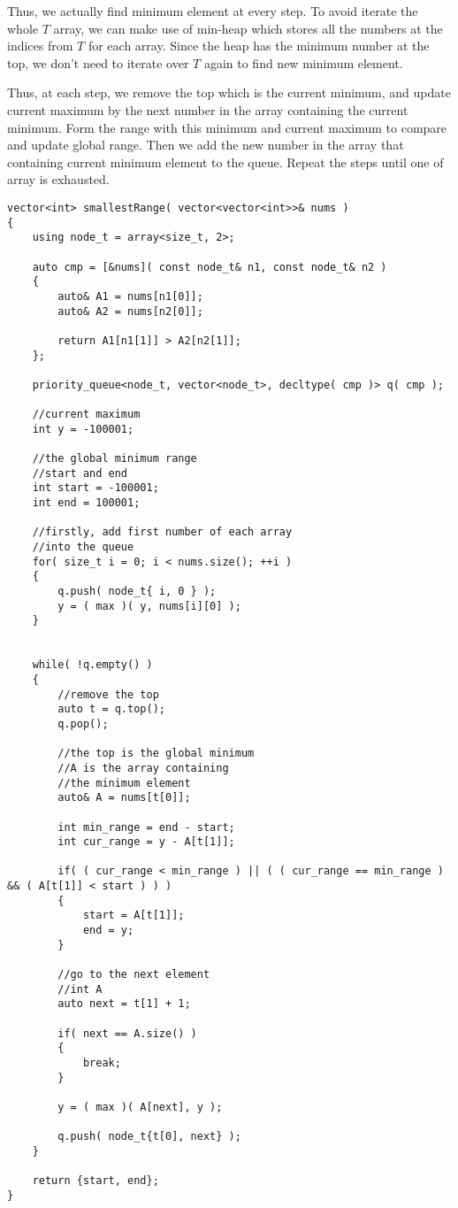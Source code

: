 Thus, we actually find minimum element at every step. To avoid iterate the whole $T$ array, we can make use of min-heap which stores all the numbers at the indices from $T$ for each array. Since the heap has the minimum number at the top, we don't need to iterate over $T$ again to find new minimum element.

Thus, at each step, we remove the top which is the current minimum, and update current maximum by the next number in the array containing the current minimum. Form the range with this minimum and current maximum to compare and update global range. Then we add the new number in the array that containing current minimum element to the queue. Repeat the steps until one of array is exhausted.

\begin{lstlisting}[style=customc, caption={Priority Queue}]
vector<int> smallestRange( vector<vector<int>>& nums )
{
    using node_t = array<size_t, 2>;

    auto cmp = [&nums]( const node_t& n1, const node_t& n2 )
    {
        auto& A1 = nums[n1[0]];
        auto& A2 = nums[n2[0]];

        return A1[n1[1]] > A2[n2[1]];
    };

    priority_queue<node_t, vector<node_t>, decltype( cmp )> q( cmp );

    //current maximum
    int y = -100001;

    //the global minimum range
    //start and end
    int start = -100001;
    int end = 100001;

    //firstly, add first number of each array
    //into the queue
    for( size_t i = 0; i < nums.size(); ++i )
    {
        q.push( node_t{ i, 0 } );
        y = ( max )( y, nums[i][0] );
    }


    while( !q.empty() )
    {
        //remove the top
        auto t = q.top();
        q.pop();

        //the top is the global minimum
        //A is the array containing
        //the minimum element
        auto& A = nums[t[0]];

        int min_range = end - start;
        int cur_range = y - A[t[1]];

        if( ( cur_range < min_range ) || ( ( cur_range == min_range ) && ( A[t[1]] < start ) ) )
        {
            start = A[t[1]];
            end = y;
        }

        //go to the next element
        //int A
        auto next = t[1] + 1;

        if( next == A.size() )
        {
            break;
        }

        y = ( max )( A[next], y );

        q.push( node_t{t[0], next} );
    }

    return {start, end};
}
\end{lstlisting}